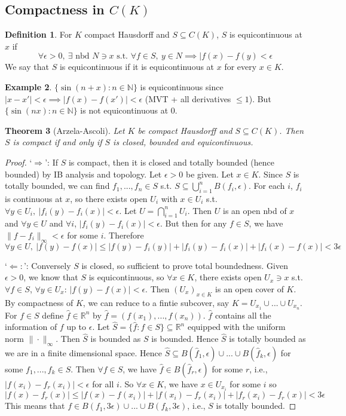 \documentclass{article}
\theoremstyle{definition}
\newtheorem{defn}{Definition}[section]
\newtheorem{example}[defn]{Example}
\theoremstyle{remark}
\theoremstyle{plain}
\newtheorem{thm}[defn]{Theorem}
\newcommand{\NN}{\mathbb{N}}
\newcommand{\RR}{\mathbb{R}}
\begin{document}
\subsection{Compactness in $C(K)$}
\begin{defn}
    For $K$ compact Hausdorff and $S\subseteq C(K)$, $S$ is equicontinuous at $x$ if 
    \[\forall\epsilon>0,\ \exists\text{ nbd } N\ni x\text{ s.t. }\forall f\in S,\ y\in N\implies |f(x)-f(y)<\epsilon\]
    We say that $S$ is equicontinuous if it is equicontinuous at $x$ for every $x\in K$.
\end{defn}
\begin{example}
    $\{\sin(n+x):n\in\NN\}$ is equicontinuous since $|x-x'|<\epsilon\implies |f(x)-f(x')|<\epsilon$ (MVT + all derivatives $\le 1$). But $\{\sin(nx):n\in\NN\}$ is not equicontinuous at $0$.
\end{example}
\begin{thm}[Arzela-Ascoli]
    Let $K$ be compact Hausdorff and $S\subseteq C(K)$. Then $S$ is compact if and only if $S$ is closed, bounded and equicontinuous.
\end{thm}
\begin{proof}
    `$\Rightarrow$': If $S$ is compact, then it is closed and totally bounded (hence bounded) by IB analysis and topology. Let $\epsilon>0$ be given. Let $x\in K$. Since $S$ is totally bounded, we can find $f_1,...,f_n\in S$ s.t. $S\subseteq \bigcup_{i=1}^nB(f_i,\epsilon)$. For each $i$, $f_i$ is continuous at $x$, so there exists open $U_i$ with $x\in U_i$ s.t. $\forall y\in U_i,\ |f_i(y)-f_i(x)|<\epsilon$. Let $U=\bigcap_{i=1}^n U_i$. Then $U$ is an open nbd of $x$ and $\forall y\in U$ and $\forall i$, $|f_i(y)-f_i(x)|<\epsilon$. But then for any $f\in S$, we have $\|f-f_i\|_\infty<\epsilon$ for some $i$. Therefore $$\forall y\in U,\ |f(y)-f(x)|\le |f(y)-f_i(y)|+|f_i(y)-f_i(x)|+|f_i(x)-f(x)|<3\epsilon$$

    `$\Leftarrow:$': Conversely $S$ is closed, so sufficient to prove total boundedness. Given $\epsilon>0$, we know that $S$ is equicontinuous, so $\forall x\in K$, there exists open $U_x\ni x$ s.t. $\forall f\in S$, $\forall y\in U_x$: $|f(y)-f(x)|<\epsilon$. Then $(U_x)_{x\in K}$ is an open cover of $K$. By compactness of $K$, we can reduce to a fintie subcover, say $K=U_{x_1}\cup...\cup U_{x_n}$. For $f\in S$ define $\hat f\in\RR^n$ by $\hat f=(f(x_1),...,f(x_n))$. $\hat f$ contains all the information of $f$ up to $\epsilon$. Let $\hat S=\{\hat f:f\in S\}\subseteq \RR^n$ equipped with the uniform norm $\|\cdot \|_\infty$. Then $\hat S$ is bounded as $S$ is bounded. Hence $\hat S$ is totally bounded as we are in a finite dimensional space. Hence $\hat S\subseteq B(\hat f_1,\epsilon)\cup...\cup B(\hat f_k,\epsilon)$ for some $f_1,...,f_k\in S$. Then $\forall f\in S$, we have $\hat f\in B(\hat f_r,\epsilon)$ for some $r$, i.e., $|f(x_i)-f_r(x_i)|<\epsilon$ for all $i$. So $\forall x\in K$, we have $x\in U_{x_i}$ for some $i$ so
    \[|f(x)-f_r(x)|\le|f(x)-f(x_i)|+|f(x_i)-f_r(x_i)|+|f_r(x_i)-f_r(x)|<3\epsilon\]
    This means that $f\in B(f_1,3\epsilon)\cup...\cup B(f_k,3\epsilon)$, i.e., $S$ is totally bounded.
\end{proof}
\end{document}
